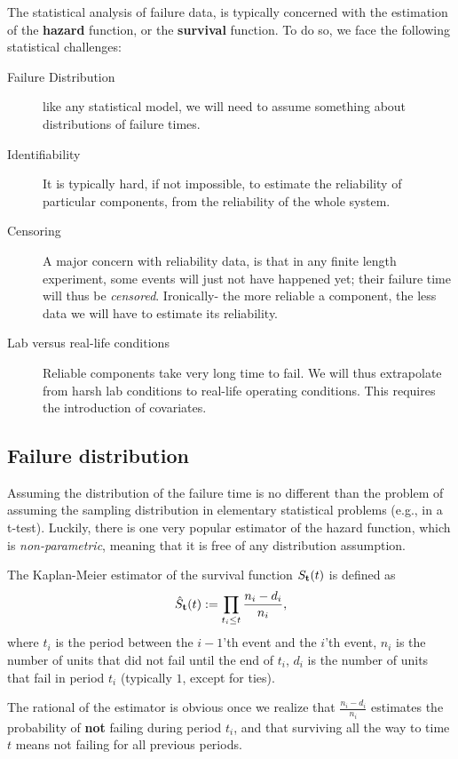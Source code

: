 The statistical analysis of failure data, is typically concerned with the estimation of the \textbf{hazard} function, or the \textbf{survival} function. 
To do so, we face the following statistical challenges:
\begin{description}
\item [Failure Distribution] like any statistical model, we will need to assume something about distributions of failure times.

\item [Identifiability] It is typically hard, if not impossible, to estimate the reliability of particular components, from the reliability of the whole system. 

\item [Censoring] A major concern with reliability data, is that in any finite length experiment, some events will just not have happened yet; their failure time will thus be \emph{censored}. Ironically- the more reliable a component, the less data we will have to estimate its reliability. 

\item [Lab versus real-life conditions] Reliable components take very long time to fail. We will thus extrapolate from harsh lab conditions to real-life operating conditions. This requires the introduction of covariates. 

\end{description}



\subsection{Failure distribution}
Assuming the distribution of the failure time is no different than the problem of assuming the sampling distribution in elementary statistical problems (e.g., in a t-test).
Luckily, there is one very popular estimator of the hazard function, which is \emph{non-parametric}, meaning that it is free of any distribution assumption.
\begin{definition}
	The Kaplan-Meier estimator of the survival function $S_{\mathbf{t}} (t)$ is defined as 
	\begin{align}
		\hat{S}_{\mathbf{t}} (t):=\prod_{t_i \leq t} \frac{n_i-d_i}{n_i},
	\end{align}
	where $t_i$ is the period between the $i-1$'th event and the $i$'th event, 
	$n_i$ is the number of units that did not fail until the end of $t_i$,
	$d_i$ is the number of units that fail in period $t_i$ (typically $1$, except for ties).
\end{definition}
The rational of the estimator is obvious once we realize that $\frac{n_i-d_i}{n_i}$ estimates the probability of \textbf{not} failing during period $t_i$, and that surviving all the way to time $t$ means not failing for all previous periods. 

